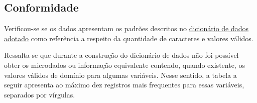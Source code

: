 \documentclass[
  12,
  table]{proadi}
\begin{document}
\hypertarget{conformidade}{%
\subsection{Conformidade}\label{conformidade}}

Verificou-se se os dados apresentam os padrões descritos no
\protect\hyperlink{dicionuxe1rio-adotado}{dicionário de dados adotado}
como referência a respeito da quantidade de caracteres e valores
válidos.

Ressalta-se que durante a construção do dicionário de dados não foi
possível obter os microdados ou informação equivalente contendo, quando
existente, os valores válidos de domínio para algumas variáveis. Nesse
sentido, a tabela a seguir apresenta ao máximo dez registros mais
frequentes para essas variáveis, separados por vírgulas.

\begingroup\fontsize{10}{12}\selectfont
\end{document}
